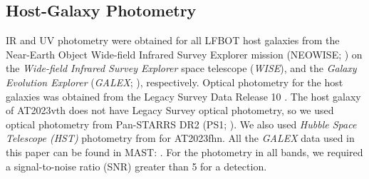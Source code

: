 \documentclass[twocolumn,twocolappendix, linenumbers, trackchanges]{aastex7}
\newcommand{\wise}{\emph{WISE}}
\newcommand{\galex}{\emph{GALEX}}
\begin{document}
\subsection{Host-Galaxy Photometry}
IR and UV photometry were obtained for all LFBOT host galaxies from the Near-Earth Object Wide-field Infrared Survey Explorer mission (NEOWISE; \citealt{neowise}) on the {\em Wide-field Infrared Survey Explorer} space telescope (\wise), and the {\em Galaxy Evolution Explorer} (\galex; \citealt{galex}), respectively.  Optical photometry for the host galaxies was obtained from the Legacy Survey Data Release 10 \citep{legacy}. The host galaxy of AT2023vth does not have Legacy Survey optical photometry, so we used optical photometry from Pan-STARRS DR2 (PS1; \citealt{panstarrs}).  We also used {\it Hubble Space Telescope (HST)} photometry from \citet{chrimesfhn} for AT2023fhn.  All the {\galex} data used in this paper can be found in MAST: .  For the photometry in all bands, we required a signal-to-noise ratio (SNR) greater than 5 for a detection.  
\end{document}
